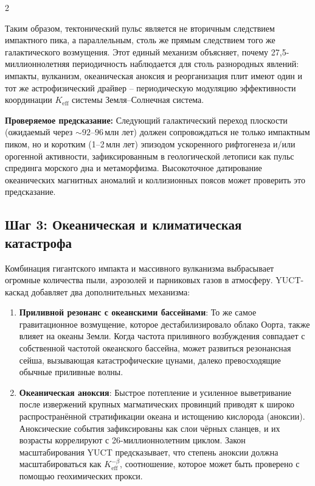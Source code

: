\documentclass[11pt,a4paper]{article}
\begin{document}
	\begin{multicols}{2}
		
		Таким образом, тектонический пульс является не вторичным следствием импактного пика, а
		параллельным, столь же прямым следствием того же галактического возмущения.
		Этот единый механизм объясняет, почему 27,5-миллионнолетняя периодичность наблюдается для столь
		разнородных явлений: импакты, вулканизм, океаническая аноксия и реорганизация плит
		имеют один и тот же астрофизический драйвер – периодическую модуляцию эффективности координации
		\(K_{\mathrm{eff}}\) системы Земля–Солнечная система.
		
		\vspace{0.2cm}
		\noindent
		\textbf{Проверяемое предсказание:} Следующий галактический переход плоскости (ожидаемый через \(\sim 92\)–\(96\) млн лет)
		должен сопровождаться не только импактным пиком, но и коротким (1–2 млн лет) эпизодом
		ускоренного рифтогенеза и/или орогенной активности, зафиксированным в геологической летописи как
		пульс спрединга морского дна и метаморфизма. Высокоточное датирование океанических магнитных
		аномалий и коллизионных поясов может проверить это предсказание.
		
		\subsection{Шаг 3: Океаническая и климатическая катастрофа}
		
		Комбинация гигантского импакта и массивного вулканизма выбрасывает огромные
		количества пыли, аэрозолей и парниковых газов в атмосферу.
		YUCT-каскад добавляет два дополнительных механизма:
		\begin{enumerate}
			\item \textbf{Приливной резонанс с океанскими бассейнами}: То же самое
			гравитационное возмущение, которое дестабилизировало облако Оорта, также влияет
			на океаны Земли. Когда частота приливного возбуждения совпадает с
			собственной частотой океанского бассейна, может развиться резонансная сейша,
			вызывающая катастрофические цунами, далеко превосходящие обычные приливные волны.
			\item \textbf{Океаническая аноксия}: Быстрое потепление и усиленное
			выветривание после извержений крупных магматических провинций приводят к
			широко распространённой стратификации океана и истощению кислорода (аноксии).
			Аноксические события зафиксированы как слои чёрных сланцев, и их возрасты
			коррелируют с 26-миллионнолетним циклом. Закон масштабирования YUCT предсказывает,
			что степень аноксии должна масштабироваться как \(K_{\mathrm{eff}}^{-\beta}\),
			соотношение, которое может быть проверено с помощью геохимических прокси.
		\end{enumerate}
		

\end{multicols}
\end{document}
